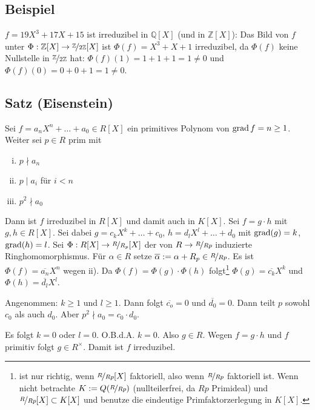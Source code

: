 \subsection[Beispiel zur Anwendung des Reduktionskriteriums]{Beispiel} %
\label{sub:94}
$f = 19 X^3 + 17X + 15$ ist irreduzibel in $\mathds{Q}[X]$ (und in $\mathds{Z}[X]$): Das Bild von $f$ unter 
$\Phi : \mathds{Z}[X] \to \nicefrac{\mathds{Z}}{2 \mathds{Z}}[X]$ ist $\Phi(f) = X^3+ X + 1$ irreduzibel, da $\Phi(f)$ keine Nullstelle in 
$\nicefrac{\mathds{Z}}{2 \mathds{Z}}$ hat: $\Phi (f)(1) = 1+1+1 = 1 \not=0$ und $\Phi (f)(0) = 0 +0 +1 = 1 \not=0$.

\subsection{Satz (Eisenstein)} %
\label{sub:95}
Sei $f = a_n X^n + \ldots + a_0 \in R[X]$ ein primitives Polynom von $\grad f = n \ge 1$. Weiter sei $p \in R$ prim mit 
\begin{enumerate}[(i)]
	\item $p \nmid a_n$
	\item $p \mid a_i$ für $i <n$
	\item $p^2 \nmid a_0$
\end{enumerate}
Dann ist $f$ irreduzibel in $R[X]$ und damit auch in $K[X]$.
Sei $f = g \cdot h$ mit $g,h \in R[X]$. Sei dabei $g = c_k X^k + \ldots + c_0$, $h = d_l X^l + \ldots + d_0$ mit $\grad (g)= k$, $\grad(h)=l$. Sei 
$\Phi : R[X] \to \nicefrac{R}{R_p}[X]$ der von $R \to \nicefrac{R}{Rp}$ induzierte Ringhomomorphismus. Für $\alpha \in R$ setze 
$\overline{\alpha} := \alpha + R_p \in \nicefrac{R}{Rp} $. Es ist $\Phi (f) = \overline{a_n} X^n $ wegen ii). Da $\Phi (f) = \Phi (g) \cdot \Phi (h)$ folgt\footnote{ist nur richtig, wenn $\nicefrac{R}{Rp}[X]$ faktoriell, also wenn $\nicefrac{R}{Rp}$ faktoriell ist. Wenn nicht betrachte $K := Q(\nicefrac{R}{Rp})$ (nullteilerfrei,
da $Rp$ Primideal) und $\nicefrac{R}{Rp}[X] \subset K[X]$ und benutze die eindeutige Primfaktorzerlegung in $K[X]$.}
$\Phi (g) = \overline{c_k}X^k $ und $\Phi (h)= \overline{d_l}X^l $. 

Angenommen: $k \ge 1$ und $l \ge 1$. Dann folgt $\overline{c_o}=0 $ und $\overline{d_0}=0 $. Dann teilt $p$ sowohl $c_0$ als auch $d_0$. Aber 
$p^2 \nmid a_0 = c_0 \cdot d_0$. \light

Es folgt $k=0$ oder $l=0$. O.B.d.A. $k=0$. Also $g \in R$. Wegen $f= g \cdot h$ und $f$ primitiv folgt $g \in R^\times$. Damit ist $f$ irreduzibel. \bewende

